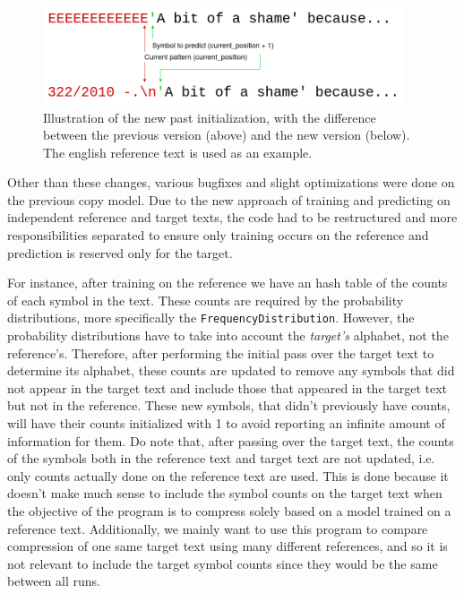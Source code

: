 \documentclass{article}
\begin{document}
\begin{figure}
    \centering
    \includegraphics[width=0.95\textwidth]{./images/lang_new_past.png}
    \caption{Illustration of the new past initialization, with the difference between the previous version (above) and the new version (below). The english reference text is used as an example.}
    \label{fig:lang_new_past}
\end{figure}

Other than these changes, various bugfixes and slight optimizations were done on the previous copy model.
Due to the new approach of training and predicting on independent reference and target texts, the code had to be restructured and more responsibilities separated to ensure only training occurs on the reference and prediction is reserved only for the target.

For instance, after training on the reference we have an hash table of the counts of each symbol in the text.
These counts are required by the probability distributions, more specifically the \texttt{FrequencyDistribution}.
However, the probability distributions have to take into account the \emph{target's} alphabet, not the reference's.
Therefore, after performing the initial pass over the target text to determine its alphabet, these counts are updated to remove any symbols that did not appear in the target text and include those that appeared in the target text but not in the reference.
These new symbols, that didn't previously have counts, will have their counts initialized with 1 to avoid reporting an infinite amount of information for them.
Do note that, after passing over the target text, the counts of the symbols both in the reference text and target text are not updated, i.e. only counts actually done on the reference text are used.
This is done because it doesn't make much sense to include the symbol counts on the target text when the objective of the program is to compress solely based on a model trained on a reference text.
Additionally, we mainly want to use this program to compare compression of one same target text using many different references, and so it is not relevant to include the target symbol counts since they would be the same between all runs.
\end{document}
